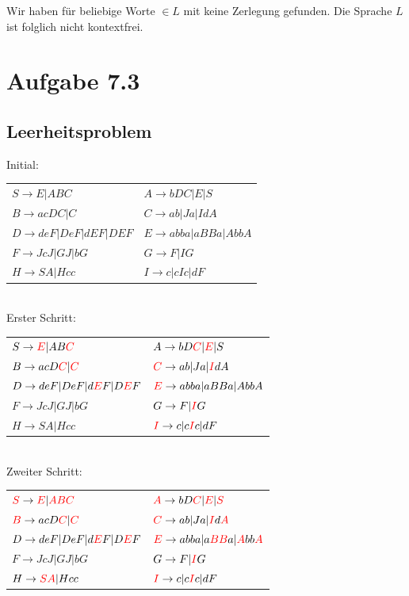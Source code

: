 \documentclass{article}
\begin{document}
\bigskip

Wir haben für beliebige Worte $\in L$ mit  keine Zerlegung gefunden. Die Sprache $L$ ist folglich nicht kontextfrei.


\section*{Aufgabe 7.3}
\subsection*{Leerheitsproblem}
\begin{center}
Initial:\\
\begin{tabular}{ll}
$S \rightarrow E | ABC$               & $A \rightarrow bDC | E | S$ \\
$B \rightarrow acDC | C$              & $C \rightarrow ab | Ja | IdA$ \\
$D \rightarrow deF | DeF | dEF | DEF$ & $E \rightarrow abba | aBBa | AbbA$ \\
$F \rightarrow JcJ | GJ | bG$         & $G \rightarrow F | IG$ \\
$H \rightarrow SA | Hcc$              & $I \rightarrow c | cIc | dF$
\end{tabular}\\
Erster Schritt:\\
\begin{tabular}{ll}
$S \rightarrow {\color{red}E} | AB{\color{red}C}$               & $A \rightarrow bD{\color{red}C} | {\color{red}E} | S$ \\
$B \rightarrow acD{\color{red}C} | {\color{red}C}$              & ${\color{red}C} \rightarrow ab | Ja | {\color{red}I}dA$ \\
$D \rightarrow deF | DeF | d{\color{red}E}F | D{\color{red}E}F$ & ${\color{red}E} \rightarrow abba | aBBa | AbbA$ \\
$F \rightarrow JcJ | GJ | bG$                                   & $G \rightarrow F | {\color{red}I}G$ \\
$H \rightarrow SA | Hcc$                                        & ${\color{red}I} \rightarrow c | c{\color{red}I}c | dF$
\end{tabular}\\
Zweiter Schritt:\\
\begin{tabular}{ll}
${\color{red}S} \rightarrow {\color{red}E} | {\color{red}ABC}$  & ${\color{red}A} \rightarrow bD{\color{red}C} | {\color{red}E} | {\color{red}S}$ \\
${\color{red}B} \rightarrow acD{\color{red}C} | {\color{red}C}$ & ${\color{red}C} \rightarrow ab | Ja | {\color{red}I}d{\color{red}A}$ \\
$D \rightarrow deF | DeF | d{\color{red}E}F | D{\color{red}E}F$ & ${\color{red}E} \rightarrow abba | a{\color{red}BB}a | {\color{red}A}bb{\color{red}A}$ \\
$F \rightarrow JcJ | GJ | bG$                                   & $G \rightarrow F | {\color{red}I}G$ \\
$H \rightarrow {\color{red}SA} | Hcc$                           & ${\color{red}I} \rightarrow c | c{\color{red}I}c | dF$
\end{tabular}
\end{center}
\end{document}
